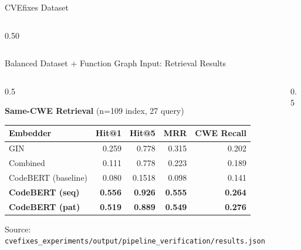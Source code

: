 \documentclass[aspectratio=169,10pt]{beamer}
\newcommand{\cmiss}[1]{\cellcolor{miss!25} #1}
\begin{document}
\begin{frame}{CVEfixes Dataset }
\begin{columns}[T]
\begin{column}{0.50\textwidth}
\begin{center}
    \end{center}
  
\end{column}
\end{columns}
\end{frame}


\begin{frame}{Balanced Dataset + Function Graph Input: Retrieval Results}

  \begin{columns}[T]
    \begin{column}{0.5\textwidth}

  \begin{center}
    {\small\textbf{Same-CWE Retrieval} {\scriptsize(n=109 index, 27 query)}}\\[6pt]
  {\scriptsize
  \renewcommand{\arraystretch}{1.35}
  \setlength{\tabcolsep}{3.5pt}
    \begin{tabular}{lrrrr}
      \toprule
      \textbf{Embedder} & \textbf{Hit@1} & \textbf{Hit@5} & \textbf{MRR} & \textbf{CWE Recall} \\
      \midrule
      GIN & 0.259 & 0.778 & 0.315 & 0.202 \\
      \rowcolor{warn!12}
      Combined & \cmiss{0.111} & 0.778 & 0.223 & 0.189 \\
      CodeBERT (baseline) & 0.080 & 0.1518 & 0.098 & 0.141 \\
      \rowcolor{hit!12}
      \textbf{CodeBERT (seq)} & \textbf{0.556} & \textbf{0.926} & \textbf{0.555} & \textbf{0.264} \\
      \textbf{CodeBERT (pat)} & \textbf{0.519} & \textbf{0.889} & \textbf{0.549} & \textbf{0.276} \\
      \bottomrule
    \end{tabular}
  }

  \vspace{0.3em}
  {\tiny\textcolor{notecol}{Source: \texttt{cvefixes\_experiments/output/pipeline\_verification/results.json}}}

  
  \end{center}
  
    \end{column}
    \begin{column}{0.5\textwidth}


\end{column}
\end{columns}
\end{frame}
\end{document}
